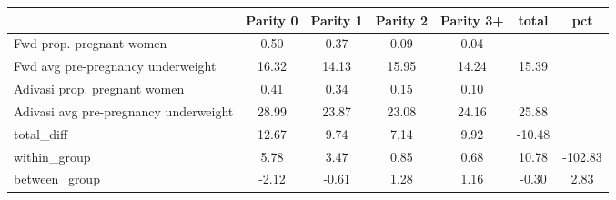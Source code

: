 \begin{tabular}{l*{6}{c}}
\toprule
            &\multicolumn{1}{c}{Parity 0}&\multicolumn{1}{c}{Parity 1}&\multicolumn{1}{c}{Parity 2}&\multicolumn{1}{c}{Parity 3+}&\multicolumn{1}{c}{total}&\multicolumn{1}{c}{pct}\\
\midrule
\midrule
Fwd prop. pregnant women&        0.50&        0.37&        0.09&        0.04&            &            \\
Fwd avg pre-pregnancy underweight&       16.32&       14.13&       15.95&       14.24&       15.39&            \\
Adivasi prop. pregnant women&        0.41&        0.34&        0.15&        0.10&            &            \\
Adivasi avg pre-pregnancy underweight&       28.99&       23.87&       23.08&       24.16&       25.88&            \\
total\_diff  &       12.67&        9.74&        7.14&        9.92&      -10.48&            \\
within\_group&        5.78&        3.47&        0.85&        0.68&       10.78&     -102.83\\
between\_group&       -2.12&       -0.61&        1.28&        1.16&       -0.30&        2.83\\
\bottomrule
\end{tabular}
